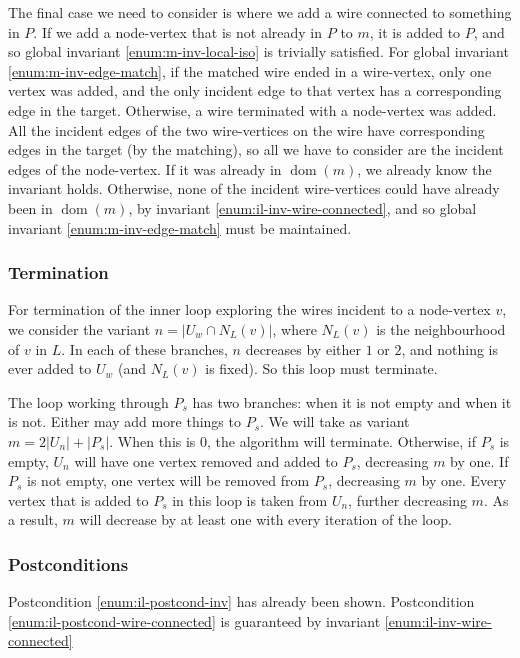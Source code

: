 \documentclass{article}
\DeclareMathOperator{\dom}{dom}
\begin{document}
The final case we need to consider is where we add a wire connected to something in $P$.  If we add a node-vertex that is not already in $P$ to $m$, it is added to $P$, and so global invariant \ref{enum:m-inv-local-iso} is trivially satisfied.  For global invariant \ref{enum:m-inv-edge-match}, if the matched wire ended in a wire-vertex, only one vertex was added, and the only incident edge to that vertex has a corresponding edge in the target.  Otherwise, a wire terminated with a node-vertex was added.  All the incident edges of the two wire-vertices on the wire have corresponding edges in the target (by the matching), so all we have to consider are the incident edges of the node-vertex.  If it was already in $\dom(m)$, we already know the invariant holds.  Otherwise, none of the incident wire-vertices could have already been in $\dom(m)$, by invariant \ref{enum:il-inv-wire-connected}, and so global invariant \ref{enum:m-inv-edge-match} must be maintained.



\subsubsection{Termination}

For termination of the inner loop exploring the wires incident to a node-vertex $v$, we consider the variant $n = |U_w\cap N_L(v)|$, where $N_L(v)$ is the neighbourhood of $v$ in $L$.  In each of these branches, $n$ decreases by either $1$ or $2$, and nothing is ever added to $U_w$ (and $N_L(v)$ is fixed).  So this loop must terminate.

The loop working through $P_s$ has two branches: when it is not empty and when it is not.  Either may add more things to $P_s$.  We will take as variant $m = 2|U_n| + |P_s|$.  When this is $0$, the algorithm will terminate.  Otherwise, if $P_s$ is empty, $U_n$ will have one vertex removed and added to $P_s$, decreasing $m$ by one.  If $P_s$ is not empty, one vertex will be removed from $P_s$, decreasing $m$ by one.  Every vertex that is added to $P_s$ in this loop is taken from $U_n$, further decreasing $m$.  As a result, $m$ will decrease by at least one with every iteration of the loop.

\subsubsection{Postconditions}

Postcondition \ref{enum:il-postcond-inv} has already been shown.  Postcondition \ref{enum:il-postcond-wire-connected} is guaranteed by invariant \ref{enum:il-inv-wire-connected}
\end{document}
